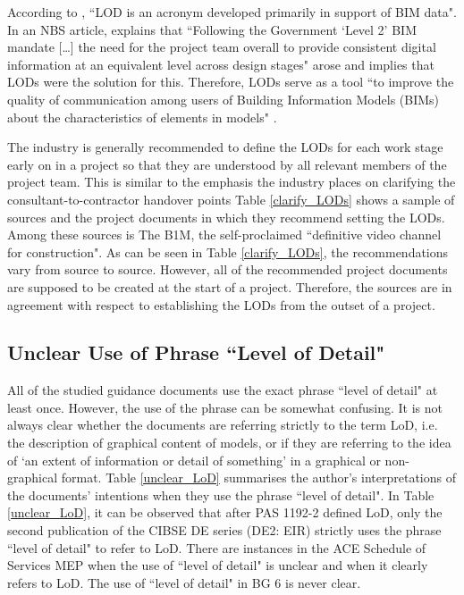 According to \cite{Fairhead2015:book}, ``LOD is an acronym developed primarily in support of BIM data".
In an NBS article, \cite{NBS_LoD_Kell} explains that ``Following the Government `Level 2' BIM mandate [\ldots] the need for the project team overall to provide consistent digital information at an equivalent level across design stages" arose and implies that LODs were the solution for this.
Therefore, LODs serve as a tool ``to improve the quality of communication among users of Building Information Models (BIMs) about the characteristics of elements in models" \citep{BIMForum2017}.

The industry is generally recommended to define the LODs for each work stage early on in a project so that they are understood by all relevant members of the project team.
This is similar to the emphasis the industry places on clarifying the consultant-to-contractor handover points 
Table \ref{clarify_LODs} shows a sample of sources and the project documents in which they recommend setting the LODs.
Among these sources is The B1M, the self-proclaimed ``definitive video channel for construction".
As can be seen in Table \ref{clarify_LODs}, the recommendations vary from source to source.
However, all of the recommended project documents are supposed to be created at the start of a project.
Therefore, the sources are in agreement with respect to establishing the LODs from the outset of a project.




\subsection{Unclear Use of Phrase ``Level of Detail"}

All of the studied guidance documents use the exact phrase ``level of detail" at least once. %
However, the use of the phrase can be somewhat confusing.
It is not always clear whether the documents are referring strictly to the term LoD, i.e. the description of graphical content of models, or if they are referring to the idea of `an extent of information or detail of something' in a graphical or non-graphical format.
Table \ref{unclear_LoD} summarises the author's interpretations of the documents' intentions when they use the phrase ``level of detail".
In Table \ref{unclear_LoD}, it can be observed that after PAS 1192-2 defined LoD, only the second publication of the CIBSE DE series (DE2: EIR) strictly uses the phrase ``level of detail" to refer to LoD.
There are instances in the ACE Schedule of Services MEP when the use of ``level of detail" is unclear and when it clearly refers to LoD.
The use of ``level of detail" in BG 6 is never clear.

